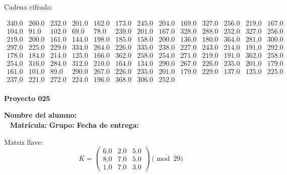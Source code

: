 \documentclass[12pt]{article}
\begin{document}
Cadena cifrada:
\begin{center}
$\begin{array}{lllllllllllll}
340.0 & 260.0 & 232.0 & 201.0 & 162.0 & 173.0 & 245.0 & 204.0 & 169.0 & 327.0 & 256.0 & 219.0 & 167.0\\
104.0 & 91.0 & 102.0 & 69.0 & 78.0 & 239.0 & 201.0 & 167.0 & 328.0 & 288.0 & 252.0 & 327.0 & 256.0\\
219.0 & 200.0 & 161.0 & 144.0 & 198.0 & 185.0 & 158.0 & 200.0 & 136.0 & 180.0 & 364.0 & 281.0 & 300.0\\
297.0 & 225.0 & 229.0 & 334.0 & 264.0 & 226.0 & 335.0 & 238.0 & 227.0 & 243.0 & 214.0 & 191.0 & 292.0\\
178.0 & 184.0 & 214.0 & 125.0 & 166.0 & 362.0 & 258.0 & 254.0 & 271.0 & 219.0 & 191.0 & 362.0 & 258.0\\
254.0 & 316.0 & 284.0 & 312.0 & 210.0 & 164.0 & 134.0 & 290.0 & 267.0 & 226.0 & 235.0 & 201.0 & 179.0\\
161.0 & 101.0 & 89.0 & 290.0 & 267.0 & 226.0 & 235.0 & 201.0 & 179.0 & 229.0 & 137.0 & 125.0 & 225.0\\
237.0 & 221.0 & 272.0 & 224.0 & 196.0 & 368.0 & 306.0 & 252.0\\
\end{array}$
\end{center}

\newpage


\textbf{Proyecto 025}

\textbf{Nombre del alumno:} \underline{\hspace{13cm}}\\\
\vspace{1cm}
\textbf{Matrícula:} \underline{\hspace{4cm}} \hspace{1cm}
\textbf{Grupo:} \underline{\hspace{2cm}}
\textbf{Fecha de entrega:} \underline{\hspace{2cm}}

\medskip

Matriz llave:
\[
K = \begin{pmatrix}
6.0 & 2.0 & 5.0\\
8.0 & 7.0 & 5.0\\
1.0 & 7.0 & 3.0
\end{pmatrix} \pmod{29}
\]
\end{document}
